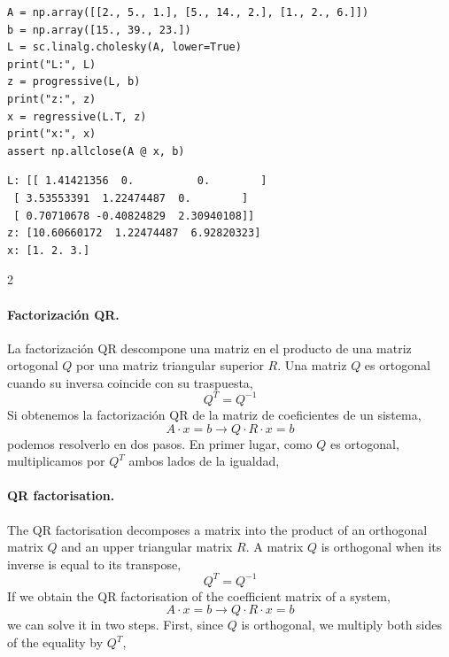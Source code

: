 \begin{verbatim}
A = np.array([[2., 5., 1.], [5., 14., 2.], [1., 2., 6.]])
b = np.array([15., 39., 23.])
L = sc.linalg.cholesky(A, lower=True)
print("L:", L)
z = progressive(L, b)
print("z:", z)
x = regressive(L.T, z)
print("x:", x)
assert np.allclose(A @ x, b)
\end{verbatim}

\begin{verbatim}
L: [[ 1.41421356  0.          0.        ]
 [ 3.53553391  1.22474487  0.        ]
 [ 0.70710678 -0.40824829  2.30940108]]
z: [10.60660172  1.22474487  6.92820323]
x: [1. 2. 3.]
\end{verbatim}

\begin{paracol}{2}
\paragraph{Factorización QR.} La factorización QR descompone una matriz en el producto de una matriz ortogonal $Q$ por una matriz triangular superior $R$. Una matriz $Q$ es ortogonal cuando su inversa coincide con su traspuesta,
\begin{equation*}
Q^T=Q^{-1}
\end{equation*}
Si obtenemos la factorización QR de la matriz de coeficientes de un sistema,
\begin{equation*}
A\cdot x=b \rightarrow Q\cdot R\cdot x =b
\end{equation*}
podemos resolverlo en dos pasos. En primer lugar, como $Q$ es ortogonal, multiplicamos por $Q^T$ ambos lados de la igualdad,

\switchcolumn
\paragraph{QR factorisation.} The QR factorisation decomposes a matrix into the product of an orthogonal matrix $Q$ and an upper triangular matrix $R$. A matrix $Q$ is orthogonal when its inverse is equal to its transpose,
\begin{equation*}
Q^T=Q^{-1}
\end{equation*}
If we obtain the QR factorisation of the coefficient matrix of a system,
\begin{equation*}
A\cdot x=b \rightarrow Q\cdot R\cdot x =b
\end{equation*}
we can solve it in two steps. First, since $Q$ is orthogonal, we multiply both sides of the equality by $Q^T$,
\end{paracol}

